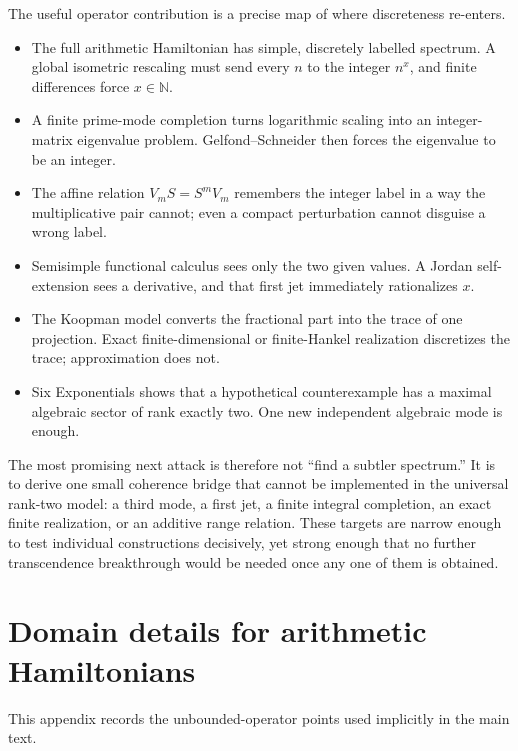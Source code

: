 \documentclass[11pt,oneside]{article}
\theoremstyle{definition}
\theoremstyle{remark}
\newcommand{\N}{\mathbb N}
\begin{document}
The useful operator contribution is a precise map of where discreteness
re-enters.

\begin{itemize}
\item The full arithmetic Hamiltonian has simple, discretely labelled
      spectrum.  A global isometric rescaling must send every \(n\) to
      the integer \(n^x\), and finite differences force \(x\in\N\).
\item A finite prime-mode completion turns logarithmic scaling into an
      integer-matrix eigenvalue problem.  Gelfond--Schneider then forces
      the eigenvalue to be an integer.
\item The affine relation \(V_mS=S^mV_m\) remembers the integer label in
      a way the multiplicative pair cannot; even a compact perturbation
      cannot disguise a wrong label.
\item Semisimple functional calculus sees only the two given values.
      A Jordan self-extension sees a derivative, and that first jet
      immediately rationalizes \(x\).
\item The Koopman model converts the fractional part into the trace of
      one projection.  Exact finite-dimensional or finite-Hankel
      realization discretizes the trace; approximation does not.
\item Six Exponentials shows that a hypothetical counterexample has a
      maximal algebraic sector of rank exactly two.  One new independent
      algebraic mode is enough.
\end{itemize}

The most promising next attack is therefore not ``find a subtler
spectrum.''  It is to derive one small coherence bridge that cannot be
implemented in the universal rank-two model: a third mode, a first jet,
a finite integral completion, an exact finite realization, or an
additive range relation.  These targets are narrow enough to test
individual constructions decisively, yet strong enough that no further
transcendence breakthrough would be needed once any one of them is
obtained.

\appendix

\section{Domain details for arithmetic Hamiltonians}

This appendix records the unbounded-operator points used implicitly in
the main text.
\end{document}
